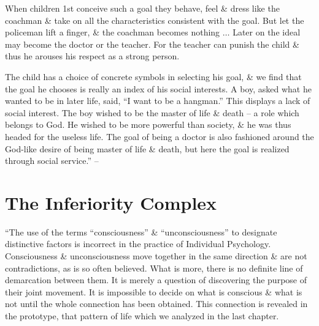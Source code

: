 \documentclass{article}
\begin{document}
When children 1st conceive such a goal they behave, feel \& dress like the coachman \& take on all the characteristics consistent with the goal. But let the policeman lift a finger, \& the coachman becomes nothing $\ldots$ Later on the ideal may become the doctor or the teacher. For the teacher can punish the child \& thus he arouses his respect as a strong person.

The child has a choice of concrete symbols in selecting his goal, \& we find that the goal he chooses is really an index of his social interests. A boy, asked what he wanted to be in later life, said, ``I want to be a hangman.'' This displays a lack of social interest. The boy wished to be the master of life \& death -- a role which belongs to God. He wished to be more powerful than society, \& he was thus headed for the useless life. The goal of being a doctor is also fashioned around the God-like desire of being master of life \& death, but here the goal is realized through social service.'' -- \cite[pp. 31--55]{Adler_science_living}


\section{The Inferiority Complex}
``The use of the terms ``consciousness'' \& ``unconsciousness'' to designate distinctive factors is incorrect in the practice of Individual Psychology. Consciousness \& unconsciousness move together in the same direction \& are not contradictions, as is so often believed. What is more, there is no definite line of demarcation between them. It is merely a question of discovering the purpose of their joint movement. It is impossible to decide on what is conscious \& what is not until the whole connection has been obtained. This connection is revealed in the prototype, that pattern of life which we analyzed in the last chapter.
\end{document}
